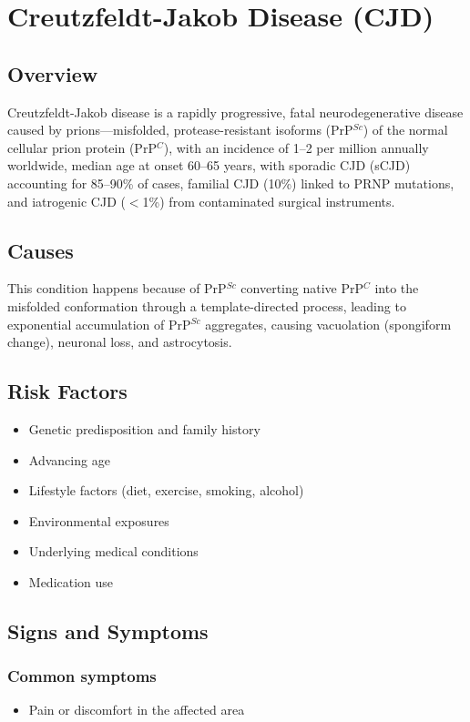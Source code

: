 \chapter{Creutzfeldt-Jakob Disease (CJD)}
\label{sec:Creutzfeldt-Jakob Disease}

\section{Overview}
Creutzfeldt-Jakob disease is a rapidly progressive, fatal neurodegenerative disease caused by prions---misfolded, protease-resistant isoforms (PrP$^{Sc}$) of the normal cellular prion protein (PrP$^{C}$), with an incidence of 1--2 per million annually worldwide, median age at onset 60--65 years, with sporadic CJD (sCJD) accounting for 85--90\% of cases, familial CJD (10\%) linked to PRNP mutations, and iatrogenic CJD ($<$1\%) from contaminated surgical instruments.
\section{Causes}
This condition happens because of PrP$^{Sc}$ converting native PrP$^{C}$ into the misfolded conformation through a template-directed process, leading to exponential accumulation of PrP$^{Sc}$ aggregates, causing vacuolation (spongiform change), neuronal loss, and astrocytosis.     
\section{Risk Factors}

\begin{itemize}[noitemsep]
  \item Genetic predisposition and family history
  \item Advancing age
  \item Lifestyle factors (diet, exercise, smoking, alcohol)
  \item Environmental exposures
  \item Underlying medical conditions
  \item Medication use
\end{itemize}
\section{Signs and Symptoms}

\subsection{Common symptoms}
\begin{itemize}[noitemsep]
  \item Pain or discomfort in the affected area
  \end{itemize}

